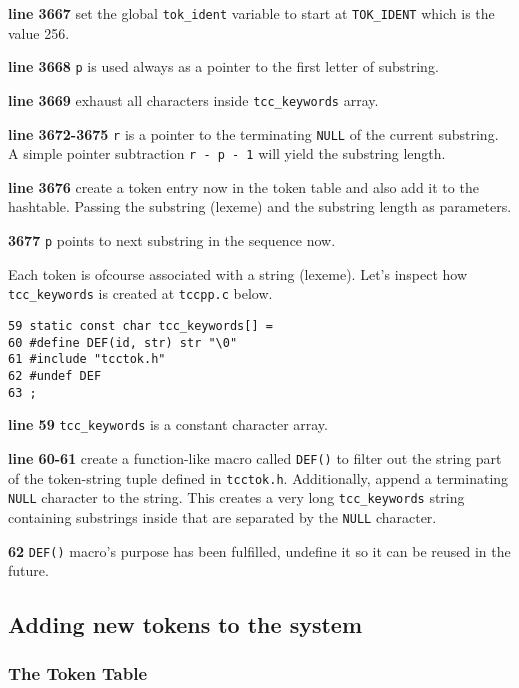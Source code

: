 \begin{tcc_desc}
\textbf{line 3667} set the global \verb|tok_ident| variable to start at \verb|TOK_IDENT| which is the value 256.

\textbf{line 3668} \verb|p| is used always as a pointer to the first letter of substring.

\textbf{line 3669} exhaust all characters inside \verb|tcc_keywords| array.

\textbf{line 3672-3675} \verb|r| is a pointer to the terminating \verb|NULL| of the current substring. A simple pointer subtraction \verb|r - p - 1| will yield the substring length.

\textbf{line 3676} create a token entry now in the token table and also add it to the hashtable. Passing the substring (lexeme) and the substring length as parameters.

\textbf{3677} \verb|p| points to next substring in the sequence now.

\end{tcc_desc}

Each token is ofcourse associated with a string (lexeme). Let's inspect how \verb|tcc_keywords| is created at \verb|tccpp.c| below.

\begin{verbatim}
59 static const char tcc_keywords[] = 
60 #define DEF(id, str) str "\0"
61 #include "tcctok.h"
62 #undef DEF
63 ;
\end{verbatim}
\begin{tcc_desc}
\textbf{line 59} \verb|tcc_keywords| is a constant character array.

\textbf{line 60-61} create a function-like macro called \verb|DEF()| to filter out the string part of the token-string tuple defined in \verb|tcctok.h|. Additionally, append a terminating \verb|NULL| character to the string. This creates a very long \verb|tcc_keywords| string containing substrings inside that are separated by the \verb|NULL| character.

\textbf{62} \verb|DEF()| macro's purpose has been fulfilled, undefine it so it can be reused in the future.
\end{tcc_desc}

\subsection{Adding new tokens to the system}

\subsubsection{The Token Table}

